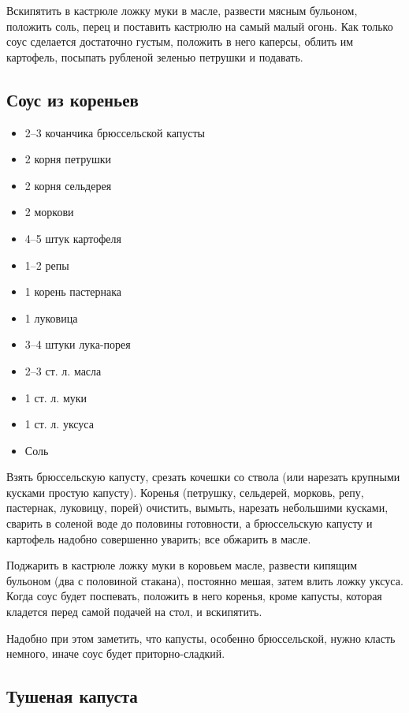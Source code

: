 Вскипятить в кастрюле ложку муки в масле, развести мясным бульоном, положить соль, перец и поставить кастрюлю на самый малый огонь. Как только соус сделается достаточно густым, положить в него каперсы, облить им картофель, посыпать рубленой зеленью петрушки и подавать.

\subsection{Соус из кореньев}

\begin{itemize}
	\item 2–3 кочанчика брюссельской капусты 
    \item 2 корня петрушки 
    \item 2 корня сельдерея 
    \item 2 моркови 
    \item 4–5 штук картофеля 
    \item 1–2 репы 
    \item 1 корень пастернака 
    \item 1 луковица 
    \item 3–4 штуки лука-порея 
    \item 2–3 ст. л. масла 
    \item 1 ст. л. муки 
    \item 1 ст. л. уксуса 
    \item Соль
\end{itemize}

Взять брюссельскую капусту, срезать кочешки со ствола (или нарезать крупными кусками простую капусту). Коренья (петрушку, сельдерей, морковь, репу, пастернак, луковицу, порей) очистить, вымыть, нарезать небольшими кусками, сварить в соленой воде до половины готовности, а брюссельскую капусту и картофель надобно совершенно уварить; все обжарить в масле.

Поджарить в кастрюле ложку муки в коровьем масле, развести кипящим бульоном (два с половиной стакана), постоянно мешая, затем влить ложку уксуса. Когда соус будет поспевать, положить в него коренья, кроме капусты, которая кладется перед самой подачей на стол, и вскипятить.

Надобно при этом заметить, что капусты, особенно брюссельской, нужно класть немного, иначе соус будет приторно-сладкий.

\subsection{Тушеная капуста}

